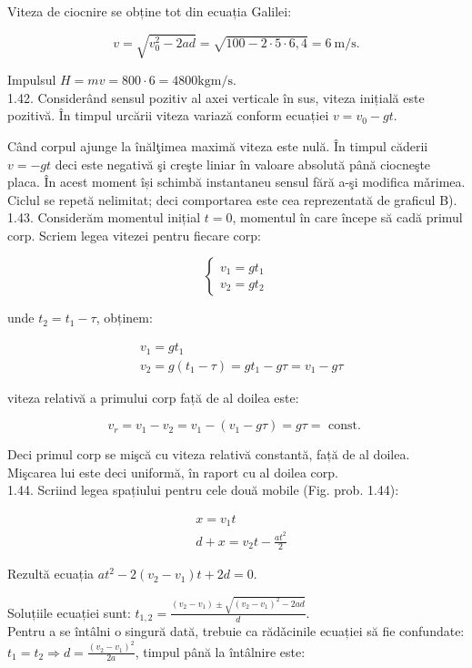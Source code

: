\documentclass[10pt]{article}
\begin{document}
Viteza de ciocnire se obține tot din ecuația Galilei:

$$
v=\sqrt{v_{0}^{2}-2 a d}=\sqrt{100-2 \cdot 5 \cdot 6,4}=6 \mathrm{~m} / \mathrm{s} .
$$

Impulsul $H=m v=800 \cdot 6=4800 \mathrm{kgm} / \mathrm{s}$.\\
1.42. Considerând sensul pozitiv al axei verticale în sus, viteza inițială este pozitivă. În timpul urcării viteza variază conform ecuației $v=v_{0}-g t$.

Când corpul ajunge la înălţimea maximă viteza este nulă. În timpul căderii $v=-g t$ deci este negativă şi creşte liniar în valoare absolută până ciocneşte placa. În acest moment își schimbă instantaneu sensul fără a-şi modifica mǎrimea. Ciclul se repetă nelimitat; deci comportarea este cea reprezentată de graficul B).\\
1.43. Considerăm momentul inițial $t=0$, momentul în care începe să cadă primul corp. Scriem legea vitezei pentru fiecare corp:

$$
\left\{\begin{array}{l}
v_{1}=g t_{1} \\
v_{2}=g t_{2}
\end{array}\right.
$$

unde $t_{2}=t_{1}-\tau$, obținem:

$$
\begin{aligned}
& v_{1}=g t_{1} \\
& v_{2}=g\left(t_{1}-\tau\right)=g t_{1}-g \tau=v_{1}-g \tau
\end{aligned}
$$

viteza relativă a primului corp față de al doilea este:

$$
v_{r}=v_{1}-v_{2}=v_{1}-\left(v_{1}-g \tau\right)=g \tau=\text { const. }
$$

Deci primul corp se mişcă cu viteza relativă constantă, față de al doilea.\\
Mişcarea lui este deci uniformă, în raport cu al doilea corp.\\
1.44. Scriind legea spațiului pentru cele două mobile (Fig. prob. 1.44):

$$
\begin{aligned}
& x=v_{1} t \\
& d+x=v_{2} t-\frac{a t^{2}}{2}
\end{aligned}
$$

Rezultă ecuația $a t^{2}-2\left(v_{2}-v_{1}\right) t+2 d=0$.

Soluțiile ecuației sunt: $t_{1,2}=\frac{\left(v_{2}-v_{1}\right) \pm \sqrt{\left(v_{2}-v_{1}\right)^{2}-2 a d}}{d}$.\\
Pentru a se întâlni o singură dată, trebuie ca rădǎcinile ecuației să fie confundate: $t_{1}=t_{2} \Rightarrow d=\frac{\left(v_{2}-v_{1}\right)^{2}}{2 a}$, timpul până la întâlnire este:
\end{document}
